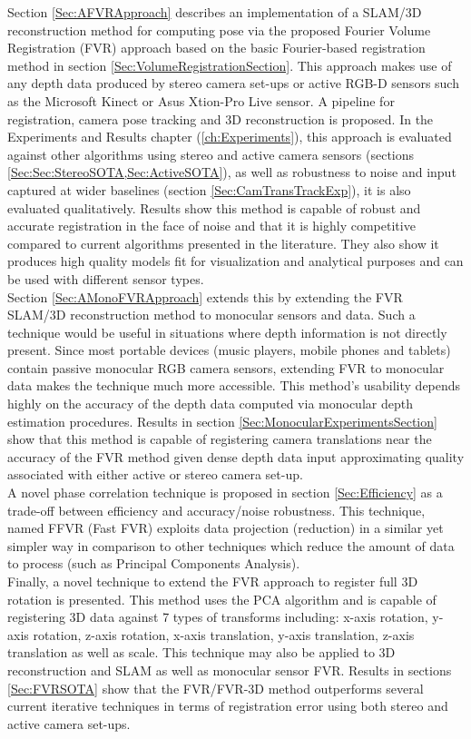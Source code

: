 Section \ref{Sec:AFVRApproach} describes an implementation of a SLAM/3D reconstruction method for computing pose via the proposed Fourier Volume Registration (FVR) approach based on the basic Fourier-based registration method in section \ref{Sec:VolumeRegistrationSection}. This approach makes use of any depth data produced by stereo camera set-ups or active RGB-D sensors such as the Microsoft Kinect or Asus Xtion-Pro Live sensor. A pipeline for registration, camera pose tracking and 3D reconstruction is proposed. In the Experiments and Results chapter (\ref{ch:Experiments}), this approach is evaluated against other algorithms using stereo and active camera sensors (sections \ref{Sec:Sec:StereoSOTA,Sec:ActiveSOTA}), as well as robustness to noise and input captured at wider baselines (section \ref{Sec:CamTransTrackExp}), it is also evaluated qualitatively. Results show this method is capable of robust and accurate registration in the face of noise and that it is highly competitive compared to current algorithms presented in the literature. They also show it produces high quality models fit for visualization and analytical purposes and can be used with different sensor types.  \\

Section \ref{Sec:AMonoFVRApproach} extends this by extending the FVR SLAM/3D reconstruction method to monocular sensors and data. Such a technique would be useful in situations where depth information is not directly present. Since most portable devices (music players, mobile phones and tablets) contain passive monocular RGB camera sensors, extending FVR to monocular data makes the technique much more accessible. This method's usability depends highly on the accuracy of the depth data computed via monocular depth estimation procedures. Results in section \ref{Sec:MonocularExperimentsSection} show that this method is capable of registering camera translations near the accuracy of the FVR method given dense depth data input approximating quality associated with either active or stereo camera set-up.  \\

A novel phase correlation technique is proposed in section \ref{Sec:Efficiency} as a trade-off between efficiency and accuracy/noise robustness. This technique, named FFVR (Fast FVR) exploits data projection (reduction) in a similar yet simpler way in comparison to other techniques which reduce the amount of data to process (such as Principal Components Analysis). \\

Finally, a novel technique to extend the FVR approach to register full 3D rotation is presented. This method uses the PCA algorithm and is capable of registering 3D data against 7 types of transforms including: x-axis rotation, y-axis rotation, z-axis rotation, x-axis translation, y-axis translation, z-axis translation as well as scale. This technique may also be applied to 3D reconstruction and SLAM as well as monocular sensor FVR. Results in sections \ref{Sec:FVRSOTA} show that the FVR/FVR-3D method outperforms several current iterative techniques in terms of registration error using both stereo and active camera set-ups.  \\